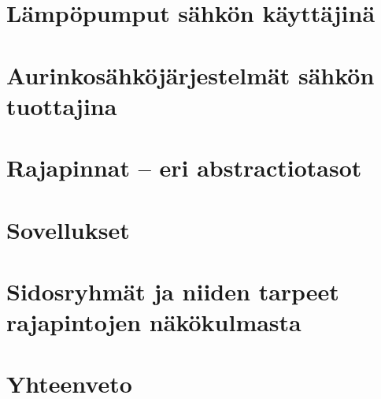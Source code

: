 \documentclass{tauthesis}
\begin{document}
\chapter{Lämpöpumput sähkön käyttäjinä}
\label{ch:pumput_sahkon_kayttajina}


\chapter{Aurinkosähköjärjestelmät sähkön tuottajina}
\label{ch:jarjestelmat_sahkon_tuottajina}


\chapter{Rajapinnat -- eri abstractiotasot}
\label{ch:rajapinat}


\chapter{Sovellukset}
\label{ch:sovellukset}


\chapter{Sidosryhmät ja niiden tarpeet rajapintojen näkökulmasta}
\label{ch:sidosryhmat_aurinko}


\chapter{Yhteenveto}
\label{ch:yhteenveto}


\printbibliography[heading=bibintoc]



%

\end{document}
